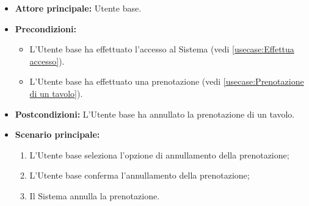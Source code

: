 \label{usecase:Annullamento della prenotazione}
\begin{itemize}
	\item \textbf{Attore principale:} Utente base.

	\item \textbf{Precondizioni:}
	\begin{itemize}
		\item L'Utente base ha effettuato l'accesso al Sistema (vedi \autoref{usecase:Effettua accesso}).
		\item L'Utente base ha effettuato una prenotazione (vedi \autoref{usecase:Prenotazione di un tavolo}).
	\end{itemize}  

	\item \textbf{Postcondizioni:}
	      L'Utente base ha annullato la prenotazione di un tavolo.

	\item \textbf{Scenario principale:}
	      \begin{enumerate}
		      \item L'Utente base seleziona l'opzione di annullamento
		            della prenotazione;

		      \item L'Utente base conferma l'annullamento della prenotazione;
		      
		      \item Il Sistema annulla la prenotazione.
	      \end{enumerate}
\end{itemize}
